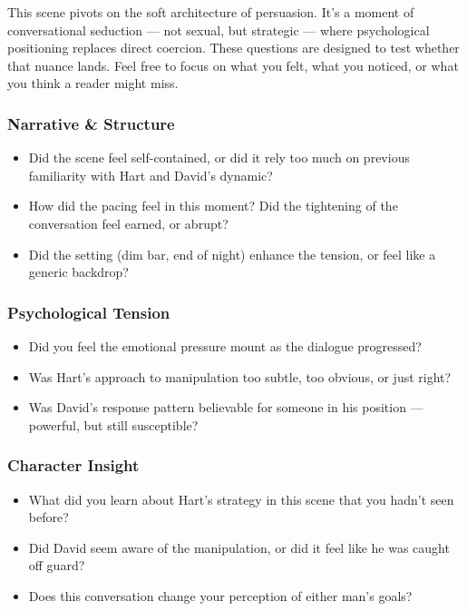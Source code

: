 This scene pivots on the soft architecture of persuasion. It’s a moment of conversational seduction — not sexual, but strategic — where psychological positioning replaces direct coercion. These questions are designed to test whether that nuance lands. Feel free to focus on what you felt, what you noticed, or what you think a reader might miss.

\subsubsection*{Narrative \& Structure}

\begin{itemize}
  \item Did the scene feel self-contained, or did it rely too much on previous familiarity with Hart and David’s dynamic?
  \item How did the pacing feel in this moment? Did the tightening of the conversation feel earned, or abrupt?
  \item Did the setting (dim bar, end of night) enhance the tension, or feel like a generic backdrop?
\end{itemize}

\subsubsection*{Psychological Tension}

\begin{itemize}
  \item Did you feel the emotional pressure mount as the dialogue progressed?
  \item Was Hart’s approach to manipulation too subtle, too obvious, or just right?
  \item Was David’s response pattern believable for someone in his position — powerful, but still susceptible?
\end{itemize}

\subsubsection*{Character Insight}

\begin{itemize}
  \item What did you learn about Hart’s strategy in this scene that you hadn’t seen before?
  \item Did David seem aware of the manipulation, or did it feel like he was caught off guard?
  \item Does this conversation change your perception of either man’s goals?
\end{itemize}


